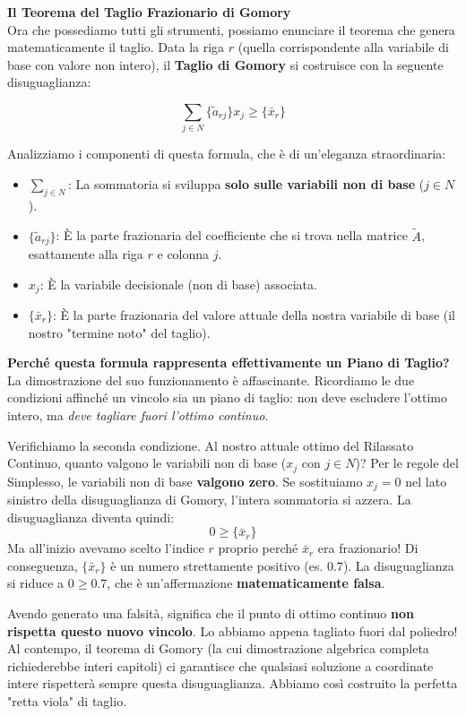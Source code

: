 \documentclass[12pt, a4paper]{article}
\begin{document}
	\textbf{Il Teorema del Taglio Frazionario di Gomory}\\
	Ora che possediamo tutti gli strumenti, possiamo enunciare il teorema che genera matematicamente il taglio. 
	Data la riga $r$ (quella corrispondente alla variabile di base con valore non intero), il \textbf{Taglio di Gomory} si costruisce con la seguente disuguaglianza:
	
	\[
	\sum_{j \in N} \{\tilde{a}_{rj}\} x_j \geq \{\bar{x}_r\}
	\]
	
	Analizziamo i componenti di questa formula, che è di un'eleganza straordinaria:
	\begin{itemize}[label=\textcolor{titlecolor}{\Large\textbullet}, itemsep=2pt, leftmargin=1.5cm]
		\item $\sum_{j \in N}$: La sommatoria si sviluppa \textbf{solo sulle variabili non di base} ($j \in N$).
		\item $\{\tilde{a}_{rj}\}$: È la parte frazionaria del coefficiente che si trova nella matrice $\tilde{A}$, esattamente alla riga $r$ e colonna $j$.
		\item $x_j$: È la variabile decisionale (non di base) associata.
		\item $\{\bar{x}_r\}$: È la parte frazionaria del valore attuale della nostra variabile di base (il nostro "termine noto" del taglio).
	\end{itemize}
	
	\textbf{Perché questa formula rappresenta effettivamente un Piano di Taglio?}\\
	La dimostrazione del suo funzionamento è affascinante. Ricordiamo le due condizioni affinché un vincolo sia un piano di taglio: non deve escludere l'ottimo intero, ma \textit{deve tagliare fuori l'ottimo continuo}.
	
	Verifichiamo la seconda condizione. Al nostro attuale ottimo del Rilassato Continuo, quanto valgono le variabili non di base ($x_j$ con $j \in N$)? Per le regole del Simplesso, le variabili non di base \textbf{valgono zero}. 
	Se sostituiamo $x_j = 0$ nel lato sinistro della disuguaglianza di Gomory, l'intera sommatoria si azzera. La disuguaglianza diventa quindi:
	\[
	0 \geq \{\bar{x}_r\}
	\]
	Ma all'inizio avevamo scelto l'indice $r$ proprio perché $\bar{x}_r$ era frazionario! Di conseguenza, $\{\bar{x}_r\}$ è un numero strettamente positivo (es. $0.7$). 
	La disuguaglianza si riduce a $0 \geq 0.7$, che è un'affermazione \textbf{matematicamente falsa}.
	
	Avendo generato una falsità, significa che il punto di ottimo continuo \textbf{non rispetta questo nuovo vincolo}. Lo abbiamo appena tagliato fuori dal poliedro! Al contempo, il teorema di Gomory (la cui dimostrazione algebrica completa richiederebbe interi capitoli) ci garantisce che qualsiasi soluzione a coordinate intere rispetterà sempre questa disuguaglianza. Abbiamo così costruito la perfetta "retta viola" di taglio.
	
\end{document}
